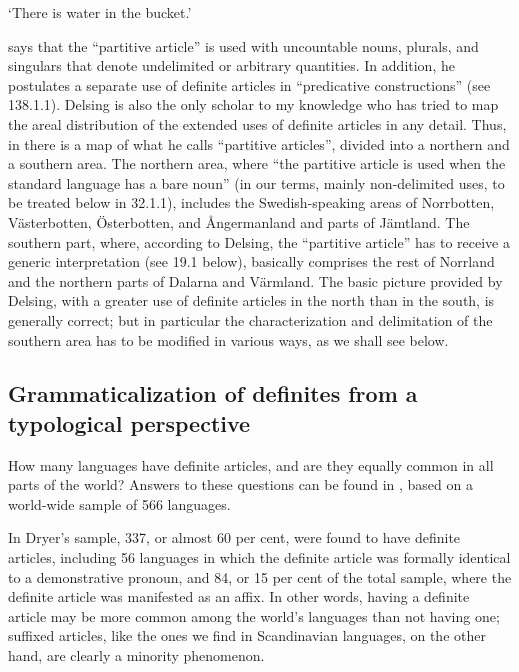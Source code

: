 \begin{styleTranslation}
‘There is water in the bucket.’

\end{styleTranslation}

\begin{styleBodyTextFirst}
\citet[15]{Delsing2003a} says that the “partitive article” is used with uncountable nouns, plurals, and singulars that denote undelimited or arbitrary quantities. In addition, he postulates a separate use of definite articles in “predicative constructions” (see 138.1.1). Delsing is also the only scholar to my knowledge who has tried to map the areal distribution of the extended uses of definite articles in any detail. Thus, in \citet[18]{Delsing2003a} there is a map of what he calls “partitive articles”, divided into a northern and a southern area. The northern area, where “the partitive article is used when the standard language has a bare noun” (in our terms, mainly non-delimited uses, to be treated below in 32.1.1), includes the Swedish-speaking areas of Norrbotten, Västerbotten, Österbotten, and Ångermanland and parts of Jämtland. The southern part, where, according to Delsing, the “partitive article” has to receive a generic interpretation (see 19.1 below), basically comprises the rest of Norrland and the northern parts of Dalarna and Värmland. The basic picture provided by Delsing, with a greater use of definite articles in the north than in the south, is generally correct; but in particular the characterization and delimitation of the southern area has to be modified in various ways, as we shall see below. 

\end{styleBodyTextFirst}

\subsection{\rmfamily Grammaticalization of definites from a typological perspective}
\label{bkm:Ref218335969}\label{bkm:Ref218335964}
\begin{styleBodyTextFirst}
How many languages have  definite articles, and are they equally common in all parts of the world? Answers to these questions can be found in \citet{Dryer2005}, based on a world-wide sample of 566 languages. 

\end{styleBodyTextFirst}

\begin{styleBodytextC}
In Dryer’s sample, 337, or almost 60 per cent, were found to have definite articles, including 56 languages in which the definite article was formally identical to a demonstrative pronoun, and 84, or 15 per cent of the total sample, where the definite article was manifested as an affix. In other words, having a definite article may be more common among the world’s languages than not having one; suffixed articles, like the ones we find in Scandinavian languages, on the other hand, are clearly a minority phenomenon. 

\end{styleBodytextC}

